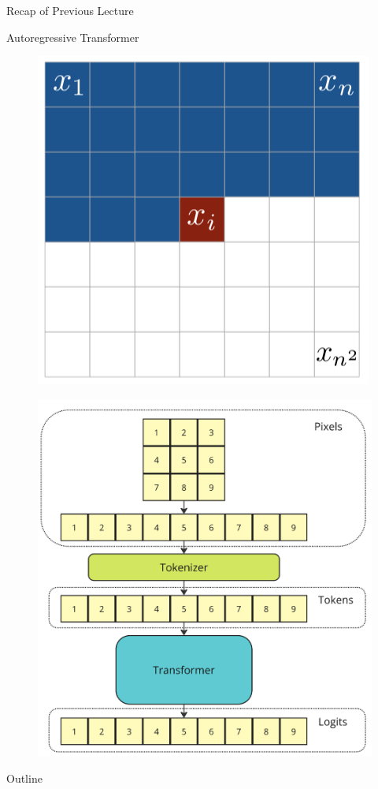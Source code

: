 \documentclass{beamer}
\begin{document}
\begin{frame}{Recap of Previous Lecture}
	\begin{block}{Autoregressive Transformer}
		\begin{minipage}[t]{0.5\columnwidth}
			\begin{figure}
				\centering
	      		\includegraphics[width=0.6\linewidth]{figs/pixelcnn1}
			\end{figure}
		\end{minipage}%
		\begin{minipage}[t]{0.5\columnwidth}
			\vspace{-0.8cm}
			\begin{figure}
				\centering
		  		\includegraphics[width=0.8\linewidth]{figs/imagegpt.png}
			\end{figure}
		\end{minipage}
	\end{block}
\end{frame}
\begin{frame}{Outline}
	\tableofcontents
\end{frame}
\end{document}
